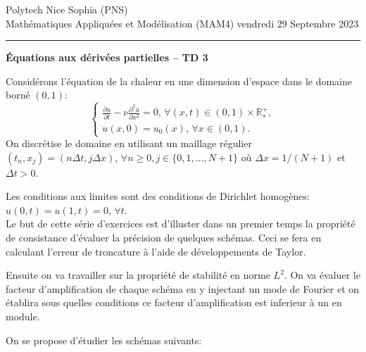 \documentclass[12pt,a4paper]{article}
\begin{document}
 \hfill Polytech Nice Sophia (PNS)\\
\noindent Math\'ematiques Appliqu\'ees et Mod\'elisation (MAM4) \hfill vendredi 29 Septembre 2023 \\

\hrule

\bigskip
\bigskip

\begin{center}{\bf \'Equations aux d\'eriv\'ees partielles --
TD 3}\end{center}

\bigskip

\parskip 12pt
\noindent Consid\'erons l'\'equation de la chaleur en une dimension d'espace dans le domaine born\'e $(0,1)$:
$$
\begin{cases}
\displaystyle\frac{\partial u}{\partial t}-\nu \frac{\partial^2 u}{\partial x^2}=0,\, \forall (x,t)\in(0,1)\times\mathbb{R}^+_*,\\[2ex]
u(x,0)=u_0(x),\,\forall x\in (0,1).
\end{cases}
$$
On discr\'etise le domaine en utilisant un maillage r\'egulier
$(t_n,x_j)=(n\Delta t,j\Delta x)$,  $\forall n\ge 0,
j\in\{0,1,...,N+1\}$ o\`u $\Delta x=1/(N+1)$ et $\Delta t>0$. 

\noindent Les conditions aux limites sont des conditions de Dirichlet homogènes:
$u(0,t)=u(1,t)=0,\,\forall t$. \\

\noindent Le but de cette s\'erie d'exercices est d'illuster dans un premier temps la propri\'et\'e de consistance
d'\'evaluer la pr\'ecision de quelques sch\'emas. Ceci se fera en calculant l'erreur de troncature \`a l'aide de d\'eveloppements de
Taylor. 
 
\noindent Ensuite on va travailler sur la
propri\'et\'e de stabilit\'e en norme $L^2$. On va évaluer le facteur
d'amplification de chaque sch\'ema en y injectant un mode de Fourier
et on \'etablira sous quelles conditions ce facteur d'amplification
est inferieur \`a un en module. 


\noindent On se propose d'\'etudier les sch\'emas suivants:
\end{document}
